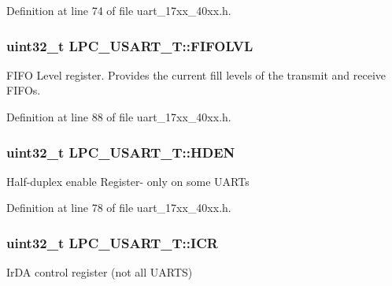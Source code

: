 Definition at line 74 of file uart\+\_\+17xx\+\_\+40xx.\+h.

\subsubsection[{\texorpdfstring{F\+I\+F\+O\+L\+VL}{FIFOLVL}}]{ uint32\+\_\+t L\+P\+C\+\_\+\+U\+S\+A\+R\+T\+\_\+\+T\+::\+F\+I\+F\+O\+L\+VL}\hypertarget{structLPC__USART__T_a1e5a80261f84a375eda3b575bea8074a}{}\label{structLPC__USART__T_a1e5a80261f84a375eda3b575bea8074a}
F\+I\+FO Level register. Provides the current fill levels of the transmit and receive F\+I\+F\+Os. 

Definition at line 88 of file uart\+\_\+17xx\+\_\+40xx.\+h.

\subsubsection[{\texorpdfstring{H\+D\+EN}{HDEN}}]{ uint32\+\_\+t L\+P\+C\+\_\+\+U\+S\+A\+R\+T\+\_\+\+T\+::\+H\+D\+EN}\hypertarget{structLPC__USART__T_aedc3d854bf59c2f0999a8ae22e3e7bb4}{}\label{structLPC__USART__T_aedc3d854bf59c2f0999a8ae22e3e7bb4}
Half-\/duplex enable Register-\/ only on some U\+A\+R\+Ts 

Definition at line 78 of file uart\+\_\+17xx\+\_\+40xx.\+h.

\subsubsection[{\texorpdfstring{I\+CR}{ICR}}]{ uint32\+\_\+t L\+P\+C\+\_\+\+U\+S\+A\+R\+T\+\_\+\+T\+::\+I\+CR}\hypertarget{structLPC__USART__T_a85c78774fcee5d86f82a4bd497db2b00}{}\label{structLPC__USART__T_a85c78774fcee5d86f82a4bd497db2b00}
Ir\+DA control register (not all U\+A\+R\+TS) 

